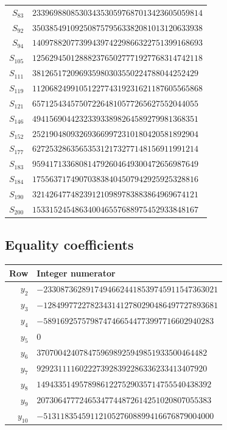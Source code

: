 \documentclass[12pt,a4paper]{article}
\numberwithin{equation}{section}
\theoremstyle{definition}
\begin{document}
{\begin{longtable}{rl}
$S_{83}$ & $2339698808530343530597687013423605059814$\\
$S_{92}$ & $3503854910925087579563382081013120633938$\\
$S_{94}$ & $1409788207739943974229866322751399168693$\\
$S_{105}$ & $1256294501288823765027771927768314742118$\\
$S_{111}$ & $381265172096935980303550224788044252429$\\
$S_{119}$ & $1120682499105122774319231621187605565868$\\
$S_{121}$ & $657125434575072264810577265627552044055$\\
$S_{146}$ & $494156904423233933898264589279981368351$\\
$S_{152}$ & $252190480932693669972310180420581892904$\\
$S_{177}$ & $627253286356535312173277148156911991214$\\
$S_{183}$ & $959417133680814792604649300472656987649$\\
$S_{184}$ & $175563717490703838404507942925925328816$\\
$S_{190}$ & $321426477482391210989783883864969674121$\\
$S_{200}$ & $153315245486340046557688975452933848167$\\
\bottomrule
\end{longtable}
}
\subsection*{Equality coefficients}
{\small
\setlength{\tabcolsep}{8pt}
\begin{longtable}{rl}
\toprule
Row & Integer numerator\\
\midrule\endhead
$y_{2}$ & $-23308736289174946624418539745911547363021$\\
$y_{3}$ & $-12849977227823431412780290486497727893681$\\
$y_{4}$ & $-5891692575798747466544773997716602940283$\\
$y_{5}$ & $0$\\
$y_{6}$ & $3707004240784759698925949851933500464482$\\
$y_{7}$ & $9292311116022273928392286336233413407920$\\
$y_{8}$ & $14943351495789861227529035714755540438392$\\
$y_{9}$ & $20730647772465347744872614251020807055383$\\
$y_{10}$ & $-5131183545911210527608899416676879004000$\\
\bottomrule
\end{longtable}
}
\end{document}
